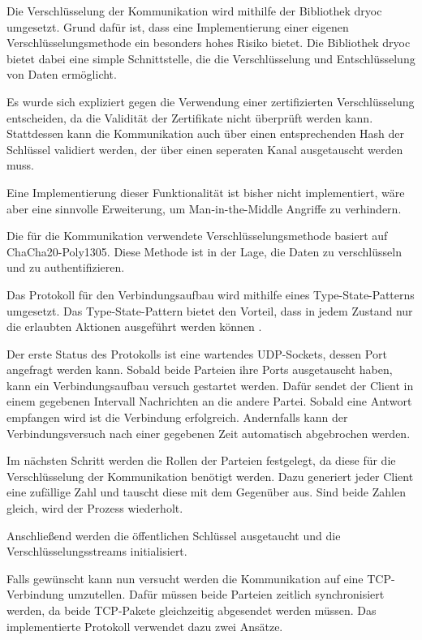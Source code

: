 Die Verschlüsselung der Kommunikation wird mithilfe der Bibliothek dryoc umgesetzt. Grund dafür ist, dass eine Implementierung einer eigenen Verschlüsselungsmethode ein besonders hohes Risiko bietet. Die Bibliothek dryoc bietet dabei eine simple Schnittstelle, die die Verschlüsselung und Entschlüsselung von Daten ermöglicht.

Es wurde sich expliziert gegen die Verwendung einer zertifizierten Verschlüsselung entscheiden, da die Validität der Zertifikate nicht überprüft werden kann. Stattdessen kann die Kommunikation auch über einen entsprechenden Hash der Schlüssel validiert werden, der über einen seperaten Kanal ausgetauscht werden muss.

Eine Implementierung dieser Funktionalität ist bisher nicht implementiert, wäre aber eine sinnvolle Erweiterung, um Man-in-the-Middle Angriffe zu verhindern.

Die für die Kommunikation verwendete Verschlüsselungsmethode basiert auf ChaCha20-Poly1305. Diese Methode ist in der Lage, die Daten zu verschlüsseln und zu authentifizieren. \cite{google-2015}

Das Protokoll für den Verbindungsaufbau wird mithilfe eines Type-State-Patterns umgesetzt. Das Type-State-Pattern bietet den Vorteil, dass in jedem Zustand nur die erlaubten Aktionen ausgeführt werden können \cite{Apodaca-2023}.

Der erste Status des Protokolls ist eine wartendes UDP-Sockets, dessen Port angefragt werden kann. Sobald beide Parteien ihre Ports ausgetauscht haben, kann ein Verbindungsaufbau versuch gestartet werden. Dafür sendet der Client in einem gegebenen Intervall Nachrichten an die andere Partei. Sobald eine Antwort empfangen wird ist die Verbindung erfolgreich. Andernfalls kann der Verbindungsversuch nach einer gegebenen Zeit automatisch abgebrochen werden.

Im nächsten Schritt werden die Rollen der Parteien festgelegt, da diese für die Verschlüsselung der Kommunikation benötigt werden. Dazu generiert jeder Client eine zufällige Zahl und tauscht diese mit dem Gegenüber aus. Sind beide Zahlen gleich, wird der Prozess wiederholt.

Anschließend werden die öffentlichen Schlüssel ausgetaucht und die Verschlüsselungsstreams initialisiert.

Falls gewünscht kann nun versucht werden die Kommunikation auf eine TCP-Verbindung umzutellen. Dafür müssen beide Parteien zeitlich synchronisiert werden, da beide TCP-Pakete gleichzeitig abgesendet werden müssen. Das implementierte Protokoll verwendet dazu zwei Ansätze.

